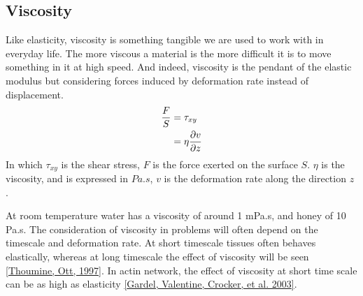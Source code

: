 \documentclass[A4paperpaper,11pt,english]{sphinxmanual}
\begin{document}
\subsection{Viscosity}
\label{parts/part1:viscosity}
Like elasticity, viscosity is something tangible we are used to work with in
everyday life. The more viscous a material is the more difficult it is to move
something in it at high speed. And indeed, viscosity is the pendant of the elastic
modulus but considering forces induced by deformation rate instead of displacement.
\begin{gather}
\begin{split}\frac{F}{S} &= \tau_{xy} \\
            &= \eta \frac{\partial v}{\partial z}\end{split}\notag
\end{gather}
In which \(\tau_{xy}\) is the shear stress, \(F\) is the force exerted
on the surface \(S\). \(\eta\) is the viscosity, and is expressed in
\(Pa.s\), \(v\) is the deformation rate along the direction \(z\) .

At room temperature water has a viscosity of around 1 mPa.s, and honey of 10 Pa.s. The consideration of viscosity in problems will
often depend on the timescale and deformation rate. At short
timescale tissues often behaves elastically, whereas at long timescale the effect
of viscosity will be seen {\hyperref[parts/part1:thoumine1997]{{[}Thoumine, Ott,  1997{]}}}. In actin network, the effect of
viscosity at short time scale can be as high as elasticity {\hyperref[parts/part1:gardel2003]{{[}Gardel, Valentine, Crocker,  et al.  2003{]}}}.
\end{document}

